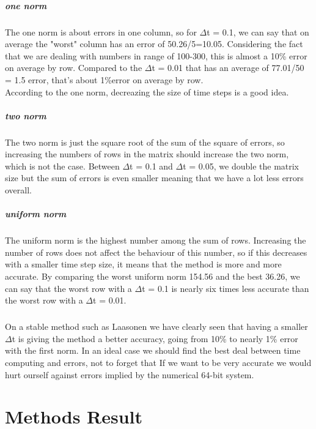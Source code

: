 \documentclass[12pt, a4paper]{report}
\begin{document}
\paragraph{one norm} The one norm is about errors in one column, so for $\Delta$t = 0.1, we can say that on average the "worst" column has an error of 50.26/5=10.05. Considering the fact that we are dealing with numbers in range of 100-300, this is almost a 10\% error on average by row. Compared to the $\Delta$t = 0.01 that has an average of 77.01/50 = 1.5 error, that's about 1\%error on average by row.\\
According to the one norm, decreazing the size of time steps is a good idea.

\paragraph{two norm} The two norm is just the square root of the sum of the square of errors, so increasing the numbers of rows in the matrix should increase the two norm, which is not the case. Between $\Delta$t = 0.1 and $\Delta$t = 0.05, we double the matrix size but the sum of errors is even smaller meaning that we have a lot less errors overall.

\paragraph{uniform norm} The uniform norm is the highest number among the sum of rows. Increasing the number of rows does not affect the behaviour of this number, so if this decreases with a smaller time step size, it means that the method is more and more accurate. By comparing the worst uniform norm 154.56 and the best 36.26,  we can say that the worst row with a $\Delta$t = 0.1 is nearly six times less accurate than the worst row with a $\Delta$t = 0.01.

\paragraph{} On a stable method such as Laasonen we have clearly seen that having a smaller $\Delta$t is giving the method a better accuracy, going from 10\% to nearly 1\% error with the first norm. In an ideal case we should find the best deal between time computing and errors, not to forget that If we want to be very accurate we would hurt ourself against errors implied by the numerical 64-bit system.

\chapter{Methods Result}
\end{document}
